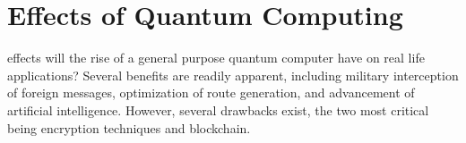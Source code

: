 \documentclass[10pt,journal,compsoc]{IEEEtran}
\begin{document}
%






\section{Effects of Quantum Computing}
 effects will the rise of a general purpose quantum computer have on real life applications? Several benefits are readily apparent, including military interception of foreign messages, optimization of route generation, and advancement of artificial intelligence. However, several drawbacks exist, the two most critical being encryption techniques and blockchain. 
\end{document}
